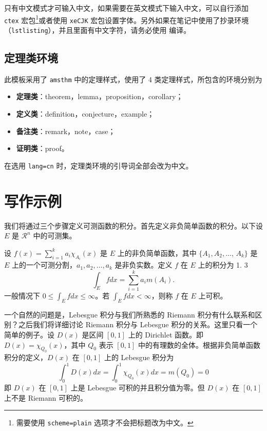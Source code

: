 \documentclass[cn,hazy,blue,14pt,normal]{elegantnote}
\begin{document}
\begin{note}
只有中文模式才可输入中文，如果需要在英文模式下输入中文，可以自行添加 \lstinline{ctex} 宏包\footnote{需要使用 \lstinline{scheme=plain} 选项才不会把标题改为中文。}或者使用 \lstinline{xeCJK} 宏包设置字体。另外如果在笔记中使用了抄录环境（\lstinline{lstlisting}），并且里面有中文字符，请务必使用  编译。
\end{note}


\subsection{定理类环境}

此模板采用了 \lstinline{amsthm} 中的定理样式，使用了 4 类定理样式，所包含的环境分别为
\begin{itemize}
  \item \textbf{定理类}：theorem，lemma，proposition，corollary；
  \item \textbf{定义类}：definition，conjecture，example；
  \item \textbf{备注类}：remark，note，case；
  \item \textbf{证明类}：proof。
\end{itemize}

\begin{remark}
在选用 \lstinline{lang=cn} 时，定理类环境的引导词全部会改为中文。
\end{remark}


\section{写作示例}

我们将通过三个步骤定义可测函数的积分。首先定义非负简单函数的积分。以下设 $E$ 是 $\mathcal{R}^n$ 中的可测集。

\begin{definition}[可积性]
设 $ f(x)=\sum\limits_{i=1}^{k} a_i \chi_{A_i}(x)$ 是 $E$ 上的非负简单函数，其中 $\{A_1,A_2,\ldots$, $A_k\}$ 是 $E$ 上的一个可测分割，$a_1,a_2,\ldots,a_k$ 是非负实数。定义 $f$ 在 $E$ 上的积分为 1. 3
\begin{equation}
   \label{inter}
   \int_{E} f dx = \sum_{i=1}^k a_i m(A_i).
\end{equation}
一般情况下 $0 \leq \int_{E} f dx \leq \infty$。若 $\int_{E} f dx < \infty$，则称 $f$ 在 $E$ 上可积。
\end{definition}

一个自然的问题是，Lebesgue 积分与我们所熟悉的 Riemann 积分有什么联系和区别？之后我们将详细讨论 Riemann 积分与 Lebesgue 积分的关系。这里只看一个简单的例子。设 $D(x)$ 是区间 $[0,1]$ 上的 Dirichlet 函数。即 $D(x)=\chi_{Q_0}(x)$，其中 $Q_0$ 表示 $[0,1]$ 中的有理数的全体。根据非负简单函数积分的定义，$D(x)$ 在 $[0,1]$ 上的 Lebesgue 积分为
\begin{equation}\label{inter2}
  \int_0^1 D(x)dx = \int_0^1 \chi_{Q_0} (x) dx = m(Q_0) = 0
\end{equation}
即 $D(x)$ 在 $[0,1]$ 上是 Lebesgue 可积的并且积分值为零。但 $D(x)$ 在 $[0,1]$ 上不是 Riemann 可积的。
\end{document}
